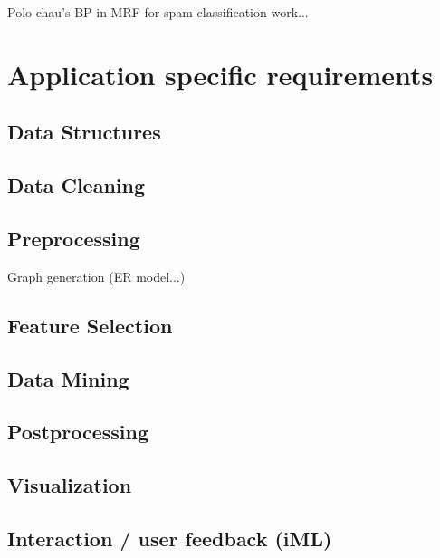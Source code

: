	Polo chau's BP in MRF for spam classification work...

\section{Application specific requirements}
\label{section:app_requirements}

	\subsection{Data Structures}
	\label{ssect:data_gathering}
	
	\subsection{Data Cleaning}
	\label{ssect:data_cleaning}
	
	\subsection{Preprocessing}
	\label{ssect:preprocessing}
	
	Graph generation (ER model...)
	
	\subsection{Feature Selection}
	\label{ssect:feature_selection}
	
	\subsection{Data Mining}
	\label{ssect:data_mining}
	
	\subsection{Postprocessing}
	\label{ssect:postprocessing}
	
	\subsection{Visualization}
	\label{ssect:visualization}
	
	\subsection{Interaction / user feedback (iML)}
	\label{ssect:interaction}
	